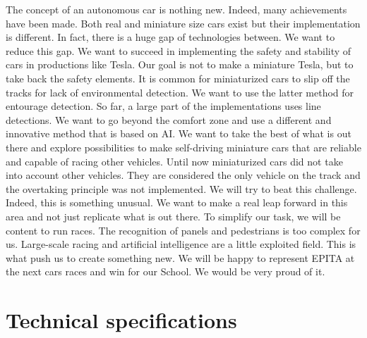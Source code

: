 \documentclass[12pt]{article}
\begin{document}
The concept of an autonomous car is nothing new. Indeed, many achievements have been made. Both real and miniature size cars exist but their implementation is different. In fact, there is a huge gap of technologies between. We want to reduce this gap. We want to succeed in implementing the safety and stability of cars in productions like Tesla. Our goal is not to make a miniature Tesla, but to take back the safety elements. It is common for miniaturized cars to slip off the tracks for lack of environmental detection. We want to use the latter method for entourage detection. So far, a large part of the implementations uses line detections. We want to go beyond the comfort zone and use a different and innovative method that is based on AI. We want to take the best of what is out there and explore possibilities to make self-driving miniature cars that are reliable and capable of racing other vehicles. Until now miniaturized cars did not take into account other vehicles. They are considered the only vehicle on the track and the overtaking principle was not implemented. We will try to beat this challenge. Indeed, this is something unusual. We want to make a real leap forward in this area and not just replicate what is out there. To simplify our task, we will be content to run races. The recognition of panels and pedestrians is too complex for us. Large-scale racing and artificial intelligence are a little exploited field. This is what push us to create something new. We will be happy to represent EPITA at the next cars races and win for our School. We would be very proud of it.

\section{Technical specifications}
\end{document}
